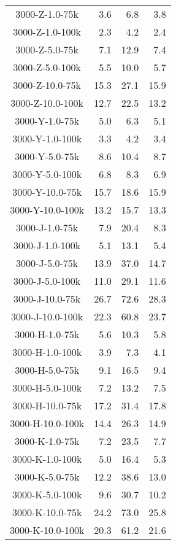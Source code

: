\begin{longtable}{crrr}
    3000-Z-1.0-75k &   3.6 &    6.8 &   3.8 \\
    3000-Z-1.0-100k &   2.3 &    4.2 &   2.4 \\
    3000-Z-5.0-75k &   7.1 &   12.9 &   7.4 \\
    3000-Z-5.0-100k &   5.5 &   10.0 &   5.7 \\
    3000-Z-10.0-75k &  15.3 &   27.1 &  15.9 \\
    3000-Z-10.0-100k &  12.7 &   22.5 &  13.2 \\
    3000-Y-1.0-75k &   5.0 &    6.3 &   5.1 \\
    3000-Y-1.0-100k &   3.3 &    4.2 &   3.4 \\
    3000-Y-5.0-75k &   8.6 &   10.4 &   8.7 \\
    3000-Y-5.0-100k &   6.8 &    8.3 &   6.9 \\
    3000-Y-10.0-75k &  15.7 &   18.6 &  15.9 \\
    3000-Y-10.0-100k &  13.2 &   15.7 &  13.3 \\
    3000-J-1.0-75k &   7.9 &   20.4 &   8.3 \\
    3000-J-1.0-100k &   5.1 &   13.1 &   5.4 \\
    3000-J-5.0-75k &  13.9 &   37.0 &  14.7 \\
    3000-J-5.0-100k &  11.0 &   29.1 &  11.6 \\
    3000-J-10.0-75k &  26.7 &   72.6 &  28.3 \\
    3000-J-10.0-100k &  22.3 &   60.8 &  23.7 \\
    3000-H-1.0-75k &   5.6 &   10.3 &   5.8 \\
    3000-H-1.0-100k &   3.9 &    7.3 &   4.1 \\
    3000-H-5.0-75k &   9.1 &   16.5 &   9.4 \\
    3000-H-5.0-100k &   7.2 &   13.2 &   7.5 \\
    3000-H-10.0-75k &  17.2 &   31.4 &  17.8 \\
    3000-H-10.0-100k &  14.4 &   26.3 &  14.9 \\
    3000-K-1.0-75k &   7.2 &   23.5 &   7.7 \\
    3000-K-1.0-100k &   5.0 &   16.4 &   5.3 \\
    3000-K-5.0-75k &  12.2 &   38.6 &  13.0 \\
    3000-K-5.0-100k &   9.6 &   30.7 &  10.2 \\
    3000-K-10.0-75k &  24.2 &   73.0 &  25.8 \\
    3000-K-10.0-100k &  20.3 &   61.2 &  21.6 \\

\end{longtable}
